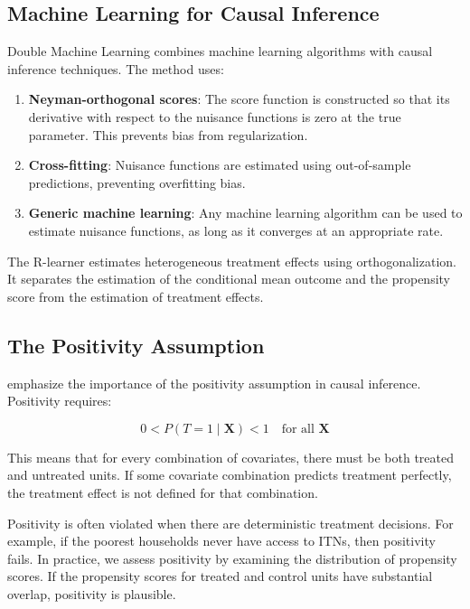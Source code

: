 \subsection{Machine Learning for Causal Inference}

Double Machine Learning \citep{chernozhukov2018double} combines machine learning algorithms with causal inference techniques. The method uses:

\begin{enumerate}
	\item \textbf{Neyman-orthogonal scores}: The score function is constructed so that its derivative with respect to the nuisance functions is zero at the true parameter. This prevents bias from regularization.
	
	\item \textbf{Cross-fitting}: Nuisance functions are estimated using out-of-sample predictions, preventing overfitting bias.
	
	\item \textbf{Generic machine learning}: Any machine learning algorithm can be used to estimate nuisance functions, as long as it converges at an appropriate rate.
\end{enumerate}

The R-learner \citep{nie2021quasi} estimates heterogeneous treatment effects using orthogonalization. It separates the estimation of the conditional mean outcome and the propensity score from the estimation of treatment effects.

\subsection{The Positivity Assumption}

\citet{westreich2010invited} emphasize the importance of the positivity assumption in causal inference. Positivity requires:

\[
0 < P(T = 1 \mid \mathbf{X}) < 1 \quad \text{for all } \mathbf{X}
\]

This means that for every combination of covariates, there must be both treated and untreated units. If some covariate combination predicts treatment perfectly, the treatment effect is not defined for that combination.

Positivity is often violated when there are deterministic treatment decisions. For example, if the poorest households never have access to ITNs, then positivity fails. In practice, we assess positivity by examining the distribution of propensity scores. If the propensity scores for treated and control units have substantial overlap, positivity is plausible.

